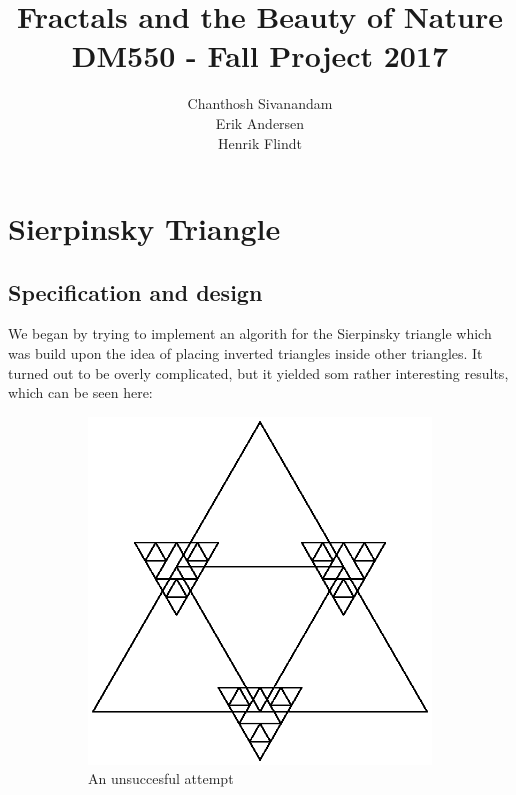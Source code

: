 \documentclass[titlepage]{article}
\author{Chanthosh Sivanandam \\ Erik Andersen \\ Henrik Flindt }
\title{Fractals and the Beauty of Nature \\ DM550 - Fall Project 2017}
\begin{document}
\maketitle
\section{Sierpinsky Triangle}
\subsection{Specification and design}
We began by trying to implement an algorith for the Sierpinsky triangle which was build upon the idea of placing inverted triangles inside other triangles. It turned out to be overly complicated, but it yielded som rather interesting results, which can be seen here:
\begin{figure}[H]
  \centering
  \begin{subfigure}[b]{0.4\textwidth}
    \includegraphics[width=\textwidth]{wrongtriangle}
    \caption{An unsuccesful attempt}
  \end{subfigure}
  \begin{subfigure}[b]{0.5\textwidth}

\end{subfigure}
\end{figure}
\end{document}
